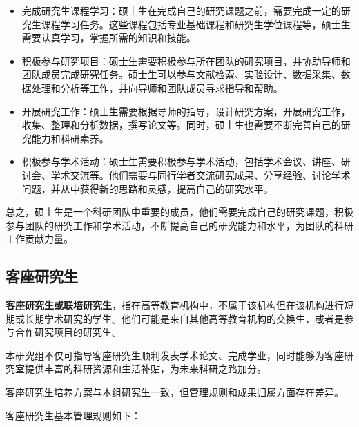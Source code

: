 \documentclass[
]{ctexbook}
\begin{document}
\begin{itemize}
\item
  完成研究生课程学习：硕士生在完成自己的研究课题之前，需要完成一定的研究生课程学习任务。这些课程包括专业基础课程和研究生学位课程等，硕士生需要认真学习，掌握所需的知识和技能。
\item
  积极参与研究项目：硕士生需要积极参与所在团队的研究项目，并协助导师和团队成员完成研究任务。硕士生可以参与文献检索、实验设计、数据采集、数据处理和分析等工作，并向导师和团队成员寻求指导和帮助。
\item
  开展研究工作：硕士生需要根据导师的指导，设计研究方案，开展研究工作，收集、整理和分析数据，撰写论文等。同时，硕士生也需要不断完善自己的研究能力和科研素养。
\item
  积极参与学术活动：硕士生需要积极参与学术活动，包括学术会议、讲座、研讨会、学术交流等。他们需要与同行学者交流研究成果、分享经验、讨论学术问题，并从中获得新的思路和灵感，提高自己的研究水平。
\end{itemize}

总之，硕士生是一个科研团队中重要的成员，他们需要完成自己的研究课题，积极参与团队的研究工作和学术活动，不断提高自己的研究能力和水平，为团队的科研工作贡献力量。

\hypertarget{ux5ba2ux5ea7ux7814ux7a76ux751f}{%
\subsection{客座研究生}\label{ux5ba2ux5ea7ux7814ux7a76ux751f}}

\textbf{客座研究生或联培研究生}，指在高等教育机构中，不属于该机构但在该机构进行短期或长期学术研究的学生。他们可能是来自其他高等教育机构的交换生，或者是参与合作研究项目的研究生。

本研究组不仅可指导客座研究生顺利发表学术论文、完成学业，同时能够为客座研究室提供丰富的科研资源和生活补贴，为未来科研之路加分。

客座研究生培养方案与本组研究生一致，但管理规则和成果归属方面存在差异。

客座研究生基本管理规则如下：
\end{document}
